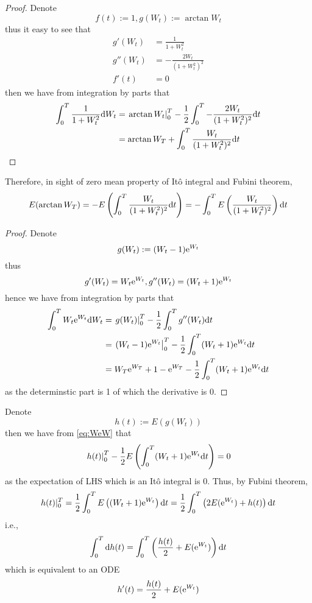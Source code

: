 \documentclass{homework}
\begin{document}
    \problem
    \begin{proof}
        Denote
        \[f(t):=1,g(W_t):=\arctan W_t\]
        thus it easy to see that
        \[\begin{aligned}
            g'(W_t)&=\frac{1}{1+W_t^2}\\
            g''(W_t)&=-\frac{2W_t}{(1+W_t^2)^2}\\
            f'(t)&=0
        \end{aligned}\]
        then we have from integration by parts that
        \[\begin{aligned}
            \int_0^T\frac{1}{1+W_t^2}\mathrm d W_t
            &=\left.\arctan W_t\right|_0^T
            -\frac{1}{2}\int_0^T-\frac{2W_t}{(1+W_t^2)^2}\mathrm d t\\
            &=\arctan W_T+\int_0^T\frac{W_t}{(1+W_t^2)^2}\mathrm d t
        \end{aligned}\]
    \end{proof}

    Therefore, in sight of zero mean property of It\^o integral and
    Fubini theorem,
    \[E(\arctan W_T)=-E\left(\int_0^T\frac{W_t}{(1+W_t^2)^2}\mathrm d t\right)
    =-\int_0^TE\left(\frac{W_t}{(1+W_t^2)^2}\right)\mathrm d t\]

    \problem
    \begin{proof}
        Denote
        \[g(W_t):=(W_t-1)\mathrm e^{W_t}\]
        thus
        \[g'(W_t)=W_t\mathrm e^{W_t},g''(W_t)=(W_t+1)\mathrm e^{W_t}\]
        hence we have from integration by parts that
        \begin{equation}
            \label{eq:WeW}
            \begin{aligned}
            \int_0^TW_t\mathrm e^{W_t}\mathrm d W_t&=
            \left.g(W_t)\right|_0^T
            -\frac{1}{2}\int_0^Tg''(W_t)\mathrm d t\\
            &=\left.(W_t-1)\mathrm e^{W_t}\right|_0^T
            -\frac{1}{2}\int_0^T(W_t+1)\mathrm e^{W_t}\mathrm d t\\
            &=W_T\mathrm e^{W_T}+1-\mathrm e^{W_T}
            -\frac{1}{2}\int_0^T(W_t+1)\mathrm e^{W_t}\mathrm d t\\
            \end{aligned}
        \end{equation}
        as the determinstic part is 1 of which the derivative is 0.
    \end{proof}

    Denote
    \[h(t):=E(g(W_t))\]
    then we have from \cref{eq:WeW} that
    \[\left.h(t)\right|_0^T
    -\frac{1}{2}E\left(\int_0^T(W_t+1)\mathrm e^{W_t}\mathrm d t\right)=0\]
    as the expectation of LHS which is an It\^o integral is 0.
    Thus, by Fubini theorem,
    \[h(t)|_0^T=\frac{1}{2}\int_0^TE\left((W_t+1)\mathrm e^{W_t}\right)\mathrm d t
    =\frac{1}{2}\int_0^T\left(2E(\mathrm e^{W_t})+h(t)\right)\mathrm d t\]
    i.e.,
    \[\int_0^T\mathrm d h(t)=\int_0^T\left(\frac{h(t)}{2}
    +E(\mathrm e^{W_t})\right)\mathrm d t\]
    which is equivalent to an ODE
    \[h'(t)=\frac{h(t)}{2}+E(\mathrm e^{W_t})\]
\end{document}

